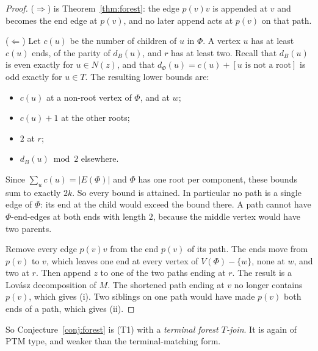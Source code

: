 \documentclass[11pt]{amsart}
\theoremstyle{definition}
\begin{document}
\begin{proof}
($\Rightarrow$) is Theorem~\ref{thm:forest}: the edge $p(v)v$ is appended at $v$ and becomes the end
edge at $p(v)$, and no later append acts at $p(v)$ on that path.

($\Leftarrow$) Let $c(u)$ be the number of children of $u$ in $\Phi$. A vertex $u$ has at least $c(u)$ ends,
of the parity of $d_B(u)$, and $r$ has at least two. Recall that $d_B(u)$ is even exactly for
$u\in N(z)$, and that $d_\Phi(u)=c(u)+[u\text{ is not a root}]$ is odd exactly for $u\in T$. The
resulting lower bounds are:
\begin{itemize}[leftmargin=*]
\item $c(u)$ at a non-root vertex of $\Phi$, and at $w$;
\item $c(u)+1$ at the other roots;
\item $2$ at $r$;
\item $d_B(u)\bmod 2$ elsewhere.
\end{itemize}
Since $\sum_u c(u)=|E(\Phi)|$ and $\Phi$ has one root per component, these bounds sum to exactly $2k$.
So every bound is attained. In particular no path is a single edge of $\Phi$: its end at the child
would exceed the bound there. A path cannot have $\Phi$-end-edges at both ends with length $2$,
because the middle vertex would have two parents.

Remove every edge $p(v)v$ from the end $p(v)$ of its path. The ends move from $p(v)$ to $v$, which
leaves one end at every vertex of $V(\Phi)-\{w\}$, none at $w$, and two at $r$. Then append $z$ to one
of the two paths ending at $r$. The result is a Lov\'asz decomposition of $M$. The shortened path
ending at $v$ no longer contains $p(v)$, which gives (i). Two siblings on one path would have made
$p(v)$ both ends of a path, which gives (ii).
\end{proof}

So Conjecture~\ref{conj:forest} is (T1) with a \emph{terminal forest $T$-join}. It is again of PTM type,
and weaker than the terminal-matching form.
\end{document}
